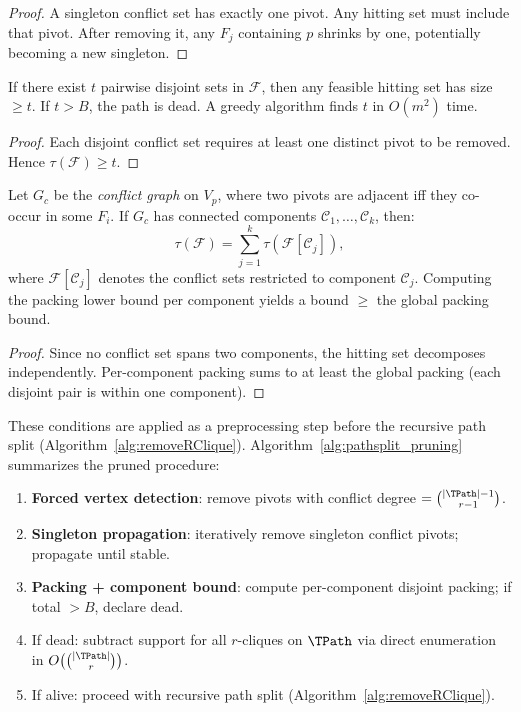 \begin{proof}
A singleton conflict set has exactly one pivot.
Any hitting set must include that pivot.
After removing it, any $F_j$ containing $p$ shrinks by one, potentially becoming a new singleton.
\end{proof}

\begin{lemma}\label{lem:packing_v}
If there exist $t$ pairwise disjoint sets in $\mathcal{F}$, then any feasible hitting set has size $\ge t$.
If $t > B$, the path is dead.
A greedy algorithm finds $t$ in $O(m^2)$ time.
\end{lemma}

\begin{proof}
Each disjoint conflict set requires at least one distinct pivot to be removed.
Hence $\tau(\mathcal{F}) \ge t$.
\end{proof}

\begin{lemma}\label{lem:component_v}
Let $G_c$ be the \emph{conflict graph} on $V_p$, where two pivots are adjacent iff they co-occur in some $F_i$.
If $G_c$ has connected components $\mathcal{C}_1, \dots, \mathcal{C}_k$, then:
\[
\tau(\mathcal{F}) = \sum_{j=1}^{k} \tau(\mathcal{F}[\mathcal{C}_j]),
\]
where $\mathcal{F}[\mathcal{C}_j]$ denotes the conflict sets restricted to component $\mathcal{C}_j$.
Computing the packing lower bound per component yields a bound $\ge$ the global packing bound.
\end{lemma}

\begin{proof}
Since no conflict set spans two components, the hitting set decomposes independently.
Per-component packing sums to at least the global packing (each disjoint pair is within one component).
\end{proof}


These conditions are applied as a preprocessing step before the recursive path split (Algorithm~\ref{alg:removeRClique}).
Algorithm~\ref{alg:pathsplit_pruning} summarizes the pruned procedure:

\begin{enumerate}[leftmargin=*]
\item \textbf{Forced vertex detection}: remove pivots with conflict degree $= \binom{|\TPath|-1}{r-1}$.
\item \textbf{Singleton propagation}: iteratively remove singleton conflict pivots; propagate until stable.
\item \textbf{Packing + component bound}: compute per-component disjoint packing; if total $> B$, declare dead.
\item If dead: subtract support for all $r$-cliques on $\TPath$ via direct enumeration in $O\bigl(\binom{|\TPath|}{r}\bigr)$.
\item If alive: proceed with recursive path split (Algorithm~\ref{alg:removeRClique}).
\end{enumerate}

